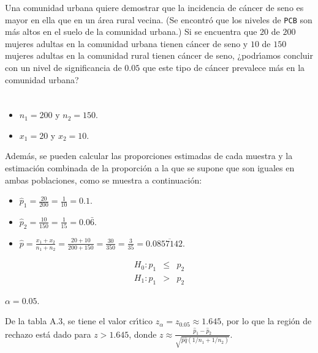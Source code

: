 \begin{enunciado}
 Una comunidad urbana quiere demostrar que la incidencia de c\'ancer de seno es mayor
 en ella que en un \'area rural vecina.
 (Se encontr\'o que los niveles de \texttt{PCB} son m\'as altos en el suelo
 de la comunidad urbana.)
 Si se encuentra que $20$ de $200$ mujeres adultas en la comunidad urbana
 tienen c\'ancer de seno y $10$ de $150$ mujeres adultas en la comunidad rural
 tienen c\'ancer de seno,
 ¿podr\'{\i}amos concluir con un nivel de significancia de $0.05$
 que este tipo de c\'ancer prevalece m\'as en la comunidad urbana?
\end{enunciado}

\begin{solucion}
 \begin{datos}
  $\phantom{0}$
  \begin{itemize}
   \item $n_1 = 200$ y $n_2 = 150$.
   \item $x_1 = 20$ y $x_2 = 10$.
  \end{itemize}
  Adem\'as, se pueden calcular las proporciones estimadas de cada muestra
  y la estimaci\'on combinada de la proporci\'on a la que se supone que son iguales
  en ambas poblaciones, como se muestra a continuaci\'on:
  \begin{itemize}
   \item $\widehat{p}_1 = \frac{20}{200} = \frac{1}{10} = 0.1$.
   \item $\widehat{p}_2 = \frac{10}{150} = \frac{1}{15} = 0.0\bar{6}$.
   \item $\widehat{p} = \frac{x_1+x_2}{n_1+n_2} = \frac{20+10}{200+150}
   = \frac{30}{350} = \frac{3}{35} = 0.0\overline{857142}$.
  \end{itemize}
 \end{datos}

 \begin{hipotesis}
  \begin{eqnarray*}
   H_0: p_1 & \leq & p_2 \\
   H_1: p_1 &  >   & p_2
  \end{eqnarray*}
 \end{hipotesis}

 \begin{significancia}
  $\alpha = 0.05$.
 \end{significancia}

 \begin{region}
  De la tabla A.3, se tiene el valor cr\'{\i}tico $z_{\alpha}=z_{0.05}\approx 1.645$,
  por lo que la regi\'on de rechazo est\'a dado para $z > 1.645$,
  donde $z \approx \frac{\hat{p}_1 - \hat{p}_2}{\sqrt{\hat{p}\hat{q}(1/n_1+1/n_2)}}$.
 \end{region}


\end{solucion}
